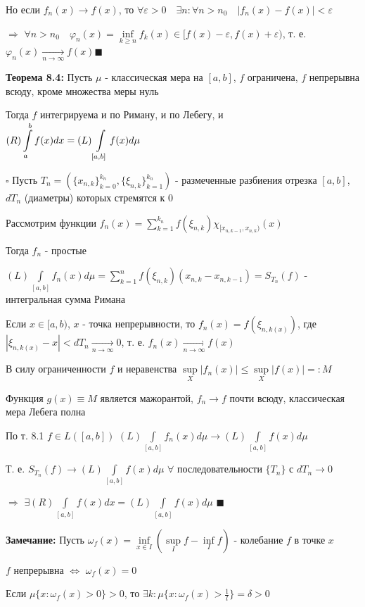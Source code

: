 \documentclass[a4paper]{report}
\newcommand*{\hm}[1]{#1\nobreak\discretionary{}%
            {\hbox{$\mathsurround=0pt #1$}}{}}
\begin{document}
Но если $f_n(x)\to f(x)$, то $\forall\varepsilon>0\quad\exists n\colon\forall n>n_0\quad|f_n(x)-f(x)|<\varepsilon$

\noindent$\Rightarrow$ $\forall n>n_0\quad\varphi_n(x)=\inf\limits_{k\ge n}f_k(x)\in[f(x)-\varepsilon,f(x)+\varepsilon)$, т. е. $\varphi_n(x)\xrightarrow[n\to\infty]{}f(x)\blacksquare$
\bigskip

\noindent\textbf{Теорема 8.4:} Пусть $\mu$ - классическая мера на $[a,b]$, $f$ ограничена, $f$ непрерывна всюду, кроме множества меры нуль

Тогда $f$ интегрируема и по Риману, и по Лебегу, и $(R)\displaystyle\int\limits_a^b f(x)dx\hm=(L)\displaystyle\int\limits_{[a,b]}f(x)d\mu$

\noindent $\square$ Пусть $T_n=\left(\{x_{n,k}\}_{k=0}^{k_n},\{\xi_{n,k}\}_{k=1}^{k_n}\right)$ - размеченные разбиения отрезка $[a,b]$, $dT_n$ (диаметры) которых стремятся к 0

Рассмотрим функции $f_n(x)=\sum\limits_{k=1}^{k_n} f(\xi_{n,k})\chi_{[x_{n,k-1},x_{n,k})}(x)$

Тогда $f_n$ - простые

$(L)\displaystyle\int\limits_{[a,b]}f_n(x)d\mu=\sum\limits_{k=1}^nf(\xi_{n,k})(x_{n,k}-x_{n,k-1})=S_{T_n}(f)$ - интегральная сумма Римана

Если $x\in[a,b)$, $x$ - точка непрерывности, то $f_n(x)=f(\xi_{n,k(x)})$, где $|\xi_{n,k(x)}-x|<dT_n\xrightarrow[n\to\infty]{}0$, т. е. $f_n(x)\xrightarrow[n\to\infty]{}f(x)$

В силу ограниченности $f$ и неравенства $\sup\limits_X|f_n(x)|\le\sup\limits_X|f(x)|=:M$

Функция $g(x)\equiv M$ является мажорантой, $f_n\to f$ почти всюду, классическая мера Лебега полна

По т. 8.1 $f\in L([a,b])$ $(L)\displaystyle\int\limits_{[a,b]}f_n(x)d\mu\to(L)\displaystyle\int\limits_{[a,b]}f(x)d\mu$

Т. е. $S_{T_n}(f)\to(L)\displaystyle\int\limits_{[a,b]}f(x)d\mu$ $\forall$ последовательности $\{T_n\}$ с $dT_n\to0$

$\Rightarrow$ $\exists(R)\displaystyle\int\limits_{[a,b]}f(x)dx=(L)\displaystyle\int\limits_{[a,b]}f(x)d\mu$ $\blacksquare$
\bigskip

\noindent\textbf{Замечание:} Пусть $\omega_f(x)=\inf\limits_{x\in I}(\sup\limits_I f-\inf\limits_I f)$ - колебание $f$ в точке $x$

$f$ непрерывна $\Leftrightarrow$ $\omega_f(x)=0$

Если $\mu\{x\colon\omega_f(x)>0\}>0$, то $\exists k\colon\mu\{x\colon\omega_f(x)>\frac1l\}=\delta>0$
\end{document}
